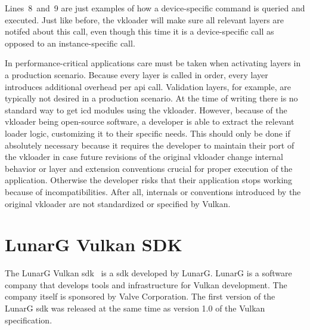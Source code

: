       Lines~8~and~9 are just examples of how a device-specific command is queried and executed.
      Just like before, the \gls{vkloader} will make sure all relevant layers are notifed about this call, even though this time it is a device-specific call as opposed to an instance-specific call.

      In performance-critical applications care must be taken when activating layers in a production scenario.
      Because every layer is called in order, every layer introduces additional overhead per \gls{api} call.
      Validation layers, for example, are typically not desired in a production scenario.
      At the time of writing there is no standard way to get \gls{icd} modules using the \gls{vkloader}.
      However, because of the \gls{vkloader} being open-source software, a developer is able to extract the relevant loader logic, customizing it to their specific needs.
      This should only be done if absolutely necessary because it requires the developer to maintain their port of the \gls{vkloader} in case future revisions of the original \gls{vkloader} change internal behavior or layer and extension conventions crucial for proper execution of the application.
      Otherwise the developer risks that their application stops working because of incompatibilities.
      After all, internals or conventions introduced by the original \gls{vkloader} are not standardized or specified by Vulkan.






  \section{LunarG Vulkan SDK}
  \label{sec:LunarGSDK}
    The LunarG Vulkan \gls{sdk}~\cite{lunargvulkansdk} is a \acrlong{sdk} developed by LunarG.
    LunarG is a software company that develops tools and infrastructure for Vulkan development.
    The company itself is sponsored by Valve Corporation.
    The first version of the LunarG \gls{sdk} was released at the same time as version 1.0 of the Vulkan specification.

